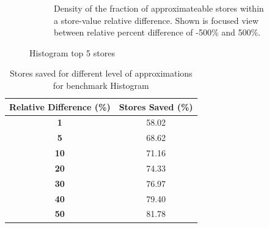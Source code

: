 \begin{figure}[htbp]
\begin{subfigure}{0.33\textwidth}
		\caption{Density of the fraction of approximateable stores within a store-value relative difference. Shown is focused view between relative percent difference of -500\% and 500\%.}
	\end{subfigure}
\caption{Histogram top 5 stores} %
\label{fig:histogram_valsim_top5}
\end{figure}

\begin{table}[htbp]
\caption{Stores saved for different level of approximations for benchmark Histogram}
	\begin{center}
		\begin{tabular}{|c|c|}
			\hline

			\textbf{Relative Difference (\%)} & \textbf{Stores Saved (\%)}\\
			\hline

			\textbf{1} & 58.02\\
			\hline

			\textbf{5} & 68.62\\
			\hline

			\textbf{10} & 71.16\\
			\hline

			\textbf{20} & 74.33\\
			\hline

			\textbf{30} & 76.97\\
			\hline

			\textbf{40} & 79.40\\
			\hline

			\textbf{50} & 81.78\\
			\hline

		\end{tabular}
	\label{tab:histogram_reldiff}
	\end{center}
\end{table}

